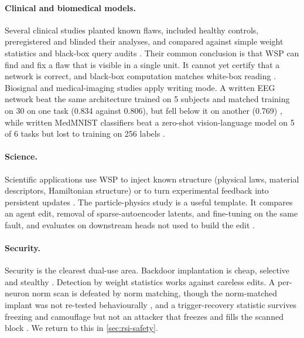 \paragraph{Clinical and biomedical models.} Several clinical studies planted known flaws, included healthy controls, preregistered and blinded their analyses, and compared against simple weight statistics and black-box query audits \citep{ax2611_05341,ax2611_07847,ax2611_24877,zen24040591}. Their common conclusion is that WSP can find and fix a flaw that is visible in a single unit. It cannot yet certify that a network is correct, and black-box computation matches white-box reading \citep{ax2611_07847}. Biosignal and medical-imaging studies apply writing mode. A written EEG network beat the same architecture trained on 5 subjects and matched training on 30 on one task (0.834 against 0.806), but fell below it on another (0.769) \citep{ax2611_13758}, while written MedMNIST classifiers beat a zero-shot vision-language model on 5 of 6 tasks but lost to training on 256 labels \citep{ax2611_12066}.

\paragraph{Science.} Scientific applications use WSP to inject known structure (physical laws, material descriptors, Hamiltonian structure) or to turn experimental feedback into persistent updates \citep{ax2611_12954,ax2611_22013,ax2611_11537,ax2611_07319}. The particle-physics study is a useful template. It compares an agent edit, removal of sparse-autoencoder latents, and fine-tuning on the same fault, and evaluates on downstream heads not used to build the edit \citep{ax2611_27079}.

\paragraph{Security.} Security is the clearest dual-use area. Backdoor implantation is cheap, selective and stealthy \citep{ax2611_17395,ax2611_27920,ax2611_27425}. Detection by weight statistics works against careless edits. A per-neuron norm scan is defeated by norm matching, though the norm-matched implant was not re-tested behaviourally \citep{zen24156363}, and a trigger-recovery statistic survives freezing and camouflage but not an attacker that freezes and fills the scanned block \citep{ax2611_19304}. We return to this in \cref{sec:rsi-safety}.
